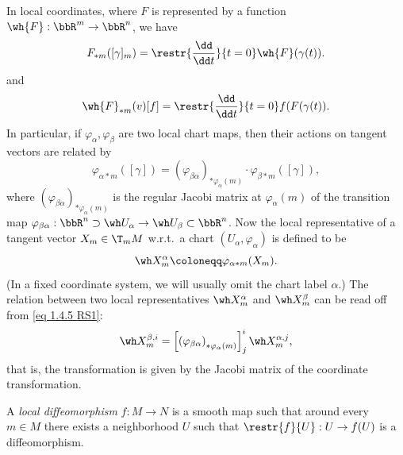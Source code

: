 \begin{rem}
    In local coordinates, where $F$ is represented by a function $\wh{F}:\bbR^m\to\bbR^n$, we have
    \[F_{\ast m}([\gamma]_m)=\restr{\frac{\dd}{\dd t}}{t=0} \wh{F}(\gamma(t)).\label{eq differential in local coordinates}\]
    and 
    \[\wh{F}_{\ast m}(v)[f]=\restr{\frac{\dd}{\dd t}}{t=0}f(F(\gamma(t)).\]
    In particular, if $\varphi_\alpha,\varphi_\beta$ are two local chart maps, then their actions on tangent vectors are related by
    \[\varphi_{\alpha\ast m}([\gamma])=\left(\varphi_{\beta\alpha}\right)_{\ast \varphi_\alpha(m)}\cdot \varphi_{\beta\ast m}([\gamma]),\label{eq 1.4.5 RS1}\]
    where $\left(\varphi_{\beta\alpha}\right)_{\ast \varphi_\alpha(m)}$ is the regular Jacobi matrix at $\varphi_\alpha(m)$ of the transition map $\varphi_{\beta\alpha}:\bbR^n\supset \wh U_\alpha\to \wh U_\beta\subset\bbR^n$. Now the local representative of a tangent vector $X_m\in \T_m M$ w.r.t.\ a chart $(U_\alpha,\varphi_\alpha)$ is defined to be 
    \[\wh X^\alpha_m\coloneqq \varphi_{\alpha\ast m}(X_m).\label{eq 1.4.8 RS1}\]
    (In a fixed coordinate system, we will usually omit the chart label $\alpha$.) The relation between two local representatives $\wh X^\alpha_m$ and $\wh X^\beta_m$ can be read off from \eqref{eq 1.4.5 RS1}:
    \[\wh X^{\beta,i}_m=\left[\left(\varphi_{\beta\alpha}\right)_{\ast \varphi_\alpha(m)}\right]^i_j \wh X^{\alpha,j}_m,\label{eq 1.4.9 RS1}\]
    that is, the transformation is given by the Jacobi matrix of the coordinate transformation.
\end{rem}

A \emph{local diffeomorphism} $f:M\to N$ is a smooth map such that around every $m\in M$ there exists a neighborhood $U$ such that $\restr{f}{U}:U\to f(U)$ is a diffeomorphism. 


